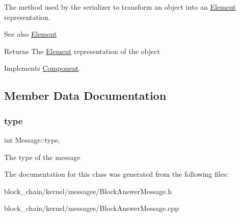 The method used by the serializer to transform an object into an \mbox{\hyperlink{classElement}{Element}} representation. \begin{DoxySeeAlso}{See also}
\mbox{\hyperlink{classElement}{Element}}
\end{DoxySeeAlso}
\begin{DoxyReturn}{Returns}
The \mbox{\hyperlink{classElement}{Element}} representation of the object 
\end{DoxyReturn}


Implements \mbox{\hyperlink{classComponent_a3e63d8c993e417a4af3f56d65ebfc7ea}{Component}}.



\subsection{Member Data Documentation}
\mbox{\label{classMessage_afbfb481c98b13d0deba0bac443bebe29}} 
\subsubsection{\texorpdfstring{type}{type}}
{\footnotesize\ttfamily int Message\+::type\hspace{0.3cm}{\ttfamily [protected]}, {\ttfamily [inherited]}}

The type of the message 

The documentation for this class was generated from the following files\+:\begin{DoxyCompactItemize}
\item 
block\+\_\+chain/kernel/messages/Block\+Answer\+Message.\+h\item 
block\+\_\+chain/kernel/messages/Block\+Answer\+Message.\+cpp\end{DoxyCompactItemize}
